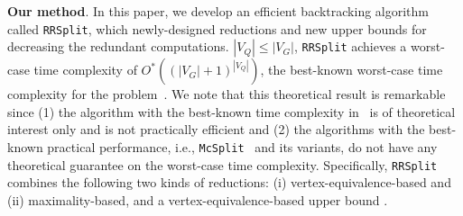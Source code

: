 \smallskip
\noindent\textbf{Our method}. In this paper, we develop an efficient backtracking algorithm called \texttt{RRSplit}, which  newly-designed reductions and new upper bounds for decreasing the redundant computations. 
{ $|V_Q|\leq |V_G|$,} \texttt{RRSplit} achieves a worst-case time complexity of $O^*((|V_G|+1)^{|V_Q|})$,  
{\chengB the best-known worst-case time complexity for the problem}~\cite{suters2005new}. 
We note that this theoretical result is remarkable since (1) the algorithm {\chengD with the best-known time complexity  in~\cite{suters2005new}} is of theoretical interest only and is not {\cheng practically} efficient and (2) {\chengD the algorithms with the best-known practical performance, i.e., \texttt{McSplit}~\cite{mccreesh2017partitioning}  and its variants,} do not have any theoretical guarantee on the worst-case time complexity.
%
{\chengB Specifically}, \texttt{RRSplit} combines the following two kinds of reductions: (i) {\chengB vertex-equivalence-based and (ii) maximality-based}, and a  vertex-equivalence-based upper bound . %

